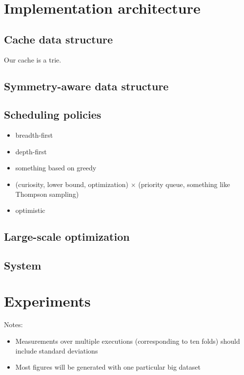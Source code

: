 

\section{Implementation architecture}

\subsection{Cache data structure}
\label{sec:cache}

Our cache is a trie.

\subsection{Symmetry-aware data structure}

\subsection{Scheduling policies}

\begin{itemize}
\item breadth-first
\item depth-first
\item something based on greedy
\item (curiosity, lower bound, optimization) $\times$ (priority queue, something like Thompson sampling)
\item optimistic
\end{itemize}

\subsection{Large-scale optimization}

\subsection{System}

\section{Experiments}
\label{sec:experiments}

Notes:
\begin{itemize}

\item Measurements over multiple executions (corresponding to ten folds)
should include standard deviations

\item Most figures will be generated with one particular big dataset
\end{itemize}

